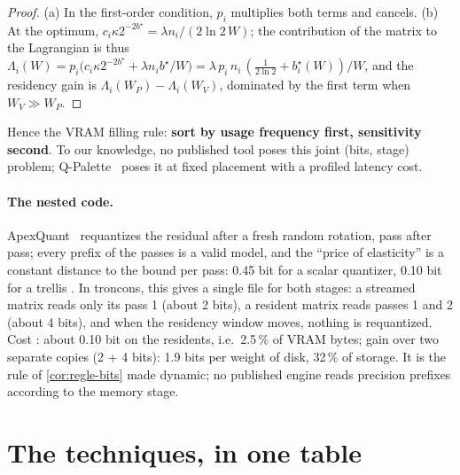 \begin{proof}
(a) In the first-order condition, $p_i$ multiplies both terms and cancels. (b) At the optimum, $c_i \kappa 2^{-2b^\star} = \lambda n_i / (2 \ln 2\, W)$; the contribution of the matrix to the Lagrangian is thus $\Lambda_i(W) = p_i\bigl(c_i\kappa 2^{-2b^\star} + \lambda n_i b^\star/W\bigr) = \lambda\, p_i\, n_i\,(\tfrac{1}{2\ln 2} + b_i^\star(W))/W$, and the residency gain is $\Lambda_i(W_P) - \Lambda_i(W_V)$, dominated by the first term when $W_V \gg W_P$.
\end{proof}

Hence the VRAM filling rule: \textbf{sort by usage frequency first, sensitivity second}. To our knowledge, no published tool poses this joint (bits, stage) problem; Q-Palette~\cite{qpalette2025} poses it at fixed placement with a profiled latency cost.

\paragraph{The nested code.} ApexQuant~\cite{apexquant2026} requantizes the residual after a fresh random rotation, pass after pass; every prefix of the passes is a valid model, and the \enquote{price of elasticity} is a constant distance to the bound per pass: 0.45 bit for a scalar quantizer, 0.10 bit for a trellis \litt. In troncons, this gives a single file for both stages: a streamed matrix reads only its pass 1 (about 2 bits), a resident matrix reads passes 1 and 2 (about 4 bits), and when the residency window moves, nothing is requantized. Cost \calc: about 0.10 bit on the residents, i.e.\ 2.5\,\% of VRAM bytes; gain over two separate copies (2 + 4 bits): 1.9 bits per weight of disk, 32\,\% of storage. It is the rule of \cref{cor:regle-bits} made dynamic; no published engine reads precision prefixes according to the memory stage.

\section{The techniques, in one table}\label{sec:techniques-quant}


